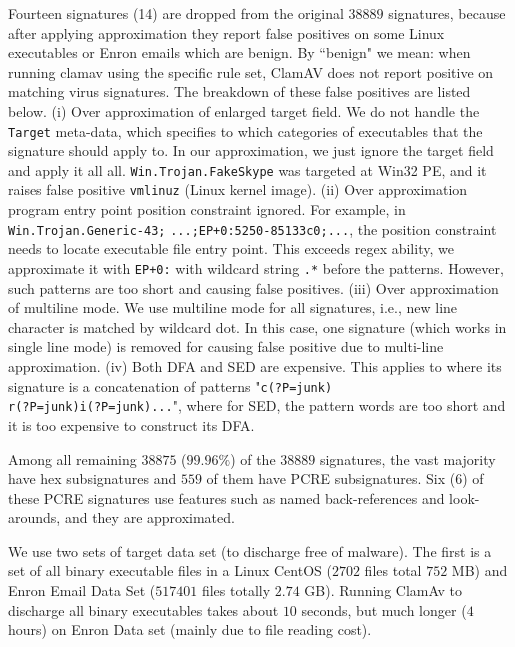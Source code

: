 Fourteen signatures (14)  are dropped
from the original $38889$ signatures,
because after applying approximation
they report false positives on
some Linux executables or Enron emails which are benign. 
By ``benign" we mean: when running clamav using the specific rule set,
ClamAV does not report positive on matching virus signatures.
The breakdown of these false positives are listed below.
(i) Over approximation of enlarged target field.
We do not handle the \texttt{Target} meta-data, which specifies
to which categories of executables that the signature should apply to.
In our approximation, we just ignore the target field and apply
it all all.  \texttt{Win.Trojan.FakeSkype} was targeted at Win32 PE,
and it raises false positive \texttt{vmlinuz} (Linux kernel image). 
(ii) Over approximation  program entry point position
constraint ignored.
For example, in \texttt{Win.Trojan.Generic-43;}
\texttt{...;EP+0:5250{-8}5133c0;...},
the position constraint needs to locate executable file entry point.
This exceeds regex ability, we approximate it
with \texttt{EP+0:} with wildcard string \texttt{.*} before the patterns. 
However, such patterns are too short and
causing false positives. 
(iii) Over approximation of multiline mode.  We use multiline mode 
for all signatures, i.e., new line character is
matched by wildcard dot. In this case, one signature (which works in
single line mode) is removed
for causing false positive due to multi-line approximation.
(iv) Both DFA and SED are expensive. This applies to 
where its signature is a concatenation of patterns 
"\texttt{c(?P=}\texttt{junk)}\\ \texttt{r(?P=junk)}\texttt{i(?P=junk)...}", 
where for SED, the pattern words are too short and it is too expensive
to construct its DFA.

Among all remaining $38875$ ($99.96\%$) of the $38889$ signatures,
the vast majority have hex subsignatures and $559$ of them have
PCRE subsignatures. Six ($6$) of these PCRE signatures use features such
as named back-references and look-arounds, and they are approximated.

We use two sets of target data set (to discharge free of malware). The first 
is a set of all binary executable files in a Linux CentOS ($2702$ files
total $752$ MB) and Enron Email Data Set ($517401$ files totally $2.74$ GB).
Running ClamAv to discharge all binary executables takes about
$10$ seconds, but much longer ($4$ hours) on Enron Data 
set (mainly due to file reading cost).

